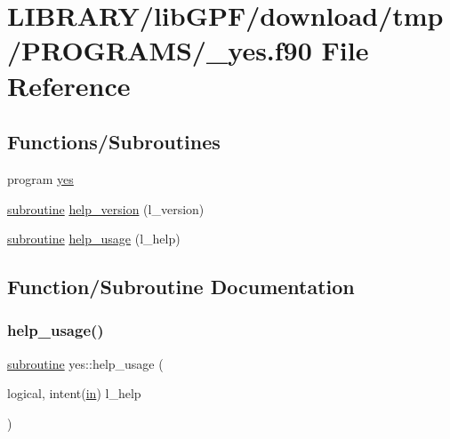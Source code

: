 \hypertarget{__yes_8f90}{}\section{L\+I\+B\+R\+A\+R\+Y/lib\+G\+P\+F/download/tmp/\+P\+R\+O\+G\+R\+A\+M\+S/\+\_\+yes.f90 File Reference}
\label{__yes_8f90}
\subsection*{Functions/\+Subroutines}
\begin{DoxyCompactItemize}
\item 
program \hyperlink{__yes_8f90_a5366917561a9747837d99d886f06cbd7}{yes}
\item 
\hyperlink{M__stopwatch_83_8txt_acfbcff50169d691ff02d4a123ed70482}{subroutine} \hyperlink{__yes_8f90_a442a735af6d8522c4de7080520d5fe9a}{help\+\_\+version} (l\+\_\+version)
\item 
\hyperlink{M__stopwatch_83_8txt_acfbcff50169d691ff02d4a123ed70482}{subroutine} \hyperlink{__yes_8f90_a29b1df982543a5b5ca4d5bb9a5985985}{help\+\_\+usage} (l\+\_\+help)
\end{DoxyCompactItemize}


\subsection{Function/\+Subroutine Documentation}
\mbox{\label{__yes_8f90_a29b1df982543a5b5ca4d5bb9a5985985}} 
\subsubsection{\texorpdfstring{help\+\_\+usage()}{help\_usage()}}
{\footnotesize\ttfamily \hyperlink{M__stopwatch_83_8txt_acfbcff50169d691ff02d4a123ed70482}{subroutine} yes\+::help\+\_\+usage (\begin{DoxyParamCaption}\item[{logical, intent(\hyperlink{M__journal_83_8txt_afce72651d1eed785a2132bee863b2f38}{in})}]{l\+\_\+help }\end{DoxyParamCaption})}



